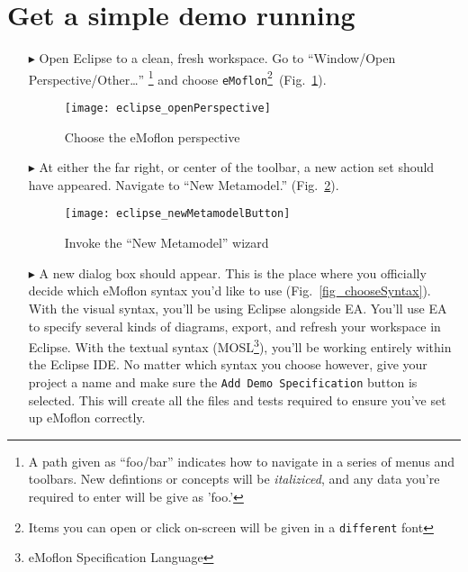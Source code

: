 \newpage
\genHeader

\section{Get a simple demo running}


\begin{itemize}
\hypertarget{simpleDemo common}{} 
\item[$\blacktriangleright$] Open Eclipse to a clean, fresh workspace. Go to ``Window/Open Perspective/Other\ldots'' \footnote{A path given as ``foo/bar''
indicates how to navigate in a series of menus and toolbars. New defintions or concepts will be \emph{italiziced}, and any data you're required to enter will be
give as 'foo.'} and choose \texttt{eMoflon}\footnote{Items you can open or click on-screen will be given in a \texttt{different} font}~(Fig.~\ref{fig_eclipse}).

\begin{figure}[htbp]
	\centering
  \texttt{[image: eclipse\_openPerspective]}
	\caption{Choose the eMoflon perspective}
	\label{fig_eclipse}
\end{figure} 

\item[$\blacktriangleright$] At either the far right, or center of the toolbar, a new action set should have appeared. Navigate to ``New Metamodel.''
(Fig.~\ref{fig_eclipseNewMetamodelButton}).

\vspace{0.5cm}
\begin{figure}[htbp]
	\centering
  \texttt{[image: eclipse\_newMetamodelButton]}
	\caption{Invoke the ``New Metamodel'' wizard}
	\label{fig_eclipseNewMetamodelButton}
\end{figure}


\newpage
\item[$\blacktriangleright$] A new dialog box should appear. This is the place where you officially decide which eMoflon syntax you'd like to use
(Fig.~\ref{fig_chooseSyntax}). With the visual syntax, you'll be using Eclipse alongside EA. You'll use EA to specify several kinds of diagrams, export, and
refresh your workspace in Eclipse. With the textual syntax (MOSL\footnote{eMoflon Specification Language}), you'll be working entirely within the Eclipse IDE.
No matter which syntax you choose however, give your project a name and make sure the \texttt{Add Demo Specification} button is selected. This will create all the
files and tests required to ensure you've set up eMoflon correctly.


\end{itemize}
